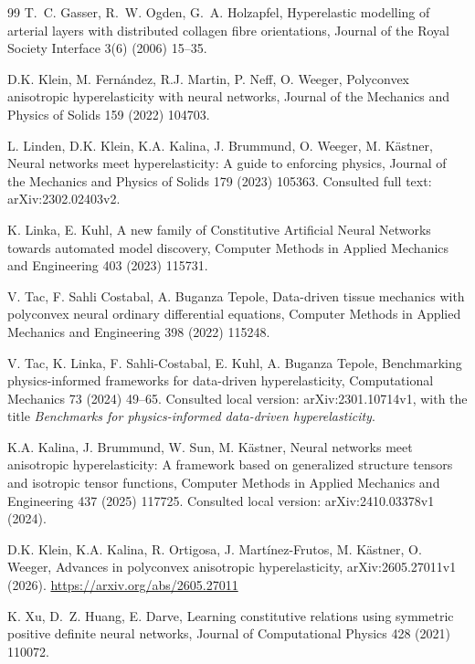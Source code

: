 \begin{thebibliography}{99}
T.~C. Gasser, R.~W. Ogden, G.~A. Holzapfel, Hyperelastic modelling of
arterial layers with distributed collagen fibre orientations,
Journal of the Royal Society Interface 3(6) (2006) 15--35.

D.K. Klein, M. Fern\'andez, R.J. Martin, P. Neff, O. Weeger, Polyconvex anisotropic hyperelasticity with neural networks, Journal of the Mechanics and Physics of Solids 159 (2022) 104703. 

L. Linden, D.K. Klein, K.A. Kalina, J. Brummund, O. Weeger, M. K\"astner,
Neural networks meet hyperelasticity: A guide to enforcing physics,
Journal of the Mechanics and Physics of Solids 179 (2023) 105363.
Consulted full text: arXiv:2302.02403v2.

K. Linka, E. Kuhl, A new family of Constitutive Artificial Neural
Networks towards automated model discovery,
Computer Methods in Applied Mechanics and Engineering 403 (2023) 115731.

V. Tac, F. Sahli Costabal, A. Buganza Tepole, Data-driven tissue
mechanics with polyconvex neural ordinary differential equations,
Computer Methods in Applied Mechanics and Engineering 398 (2022) 115248.

V. Tac, K. Linka, F. Sahli-Costabal, E. Kuhl, A. Buganza Tepole,
Benchmarking physics-informed frameworks for data-driven hyperelasticity,
Computational Mechanics 73 (2024) 49--65.
Consulted local version: arXiv:2301.10714v1, with the title \emph{Benchmarks for physics-informed data-driven hyperelasticity}.

K.A. Kalina, J. Brummund, W. Sun, M. K\"astner,
Neural networks meet anisotropic hyperelasticity: A framework based on generalized structure tensors and isotropic tensor functions,
Computer Methods in Applied Mechanics and Engineering 437 (2025) 117725.
Consulted local version: arXiv:2410.03378v1 (2024).

D.K. Klein, K.A. Kalina, R. Ortigosa, J. Mart\'inez-Frutos, M. K\"astner, O. Weeger, Advances in polyconvex anisotropic hyperelasticity, arXiv:2605.27011v1 (2026). \url{https://arxiv.org/abs/2605.27011}

K. Xu, D.~Z. Huang, E. Darve, Learning constitutive relations using
symmetric positive definite neural networks,
Journal of Computational Physics 428 (2021) 110072.


\end{thebibliography}
